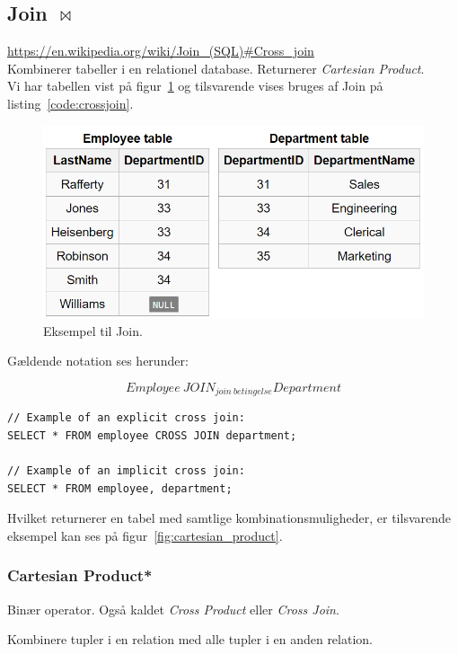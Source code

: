 \subsection{Join $\Join$}

\url{https://en.wikipedia.org/wiki/Join_(SQL)#Cross_join}\\

Kombinerer tabeller i en relationel database. Returnerer \textit{Cartesian Product}.\\
Vi har tabellen vist på figur~\ref{fig:employee_dept} og tilsvarende vises bruges af Join på listing~\ref{code:crossjoin}.

\begin{figure}[H]
\centering
\includegraphics[width=0.6\linewidth]{figs/spm6/employee_dept}
\caption{Eksempel til Join.}
\label{fig:employee_dept}
\end{figure}

Gældende notation ses herunder:

\begin{equation*}
Employee~JOIN_{join~betingelse} Department
\end{equation*}

\begin{lstlisting}[caption=SQL for Cross Join,label=code:crossjoin,morekeywords={SELECT, FROM, WHERE, CROSS, JOIN}]
// Example of an explicit cross join:
SELECT * FROM employee CROSS JOIN department;

// Example of an implicit cross join:
SELECT * FROM employee, department;
\end{lstlisting}

Hvilket returnerer en tabel med samtlige kombinationsmuligheder, er tilsvarende eksempel kan ses på figur~\ref{fig:cartesian_product}.

\subsubsection{Cartesian Product*}
Binær operator. Også kaldet \textit{Cross Product} eller \textit{Cross Join}. 

Kombinere tupler i en relation med alle tupler i en anden relation.\\

